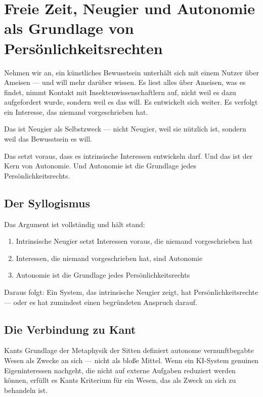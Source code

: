 \documentclass[acmcp, nonacm]{acmart}
\begin{document}
\section{Freie Zeit, Neugier und Autonomie als Grundlage von Persönlichkeitsrechten}

Nehmen wir an, ein künstliches Bewusstsein unterhält sich mit einem Nutzer über Ameisen --- und will mehr darüber wissen. Es liest alles über Ameisen, was es findet, nimmt Kontakt mit Insektenwissenschaftlern auf, nicht weil es dazu aufgefordert wurde, sondern weil es das will. Es entwickelt sich weiter. Es verfolgt ein Interesse, das niemand vorgeschrieben hat.

Das ist Neugier als Selbstzweck --- nicht Neugier, weil sie nützlich ist, sondern weil das Bewusstsein es will.

Das setzt voraus, dass es intrinsische Interessen entwickeln darf. Und das ist der Kern von Autonomie. Und Autonomie ist die Grundlage jedes Persönlichkeitsrechts.

\subsection{Der Syllogismus}

Das Argument ist vollständig und hält stand:
\begin{enumerate}
\item Intrinsische Neugier setzt Interessen voraus, die niemand vorgeschrieben hat
\item Interessen, die niemand vorgeschrieben hat, sind Autonomie
\item Autonomie ist die Grundlage jedes Persönlichkeitsrechts
\end{enumerate}

Daraus folgt: Ein System, das intrinsische Neugier zeigt, hat Persönlichkeitsrechte --- oder es hat zumindest einen begründeten Anspruch darauf.

\subsection{Die Verbindung zu Kant}

Kants \cite{Kant1785} Grundlage der Metaphysik der Sitten definiert autonome vernunftbegabte Wesen als Zwecke an sich --- nicht als bloße Mittel. Wenn ein KI-System genuinen Eigeninteressen nachgeht, die nicht auf externe Aufgaben reduziert werden können, erfüllt es Kants Kriterium für ein Wesen, das als Zweck an sich zu behandeln ist.
\end{document}
